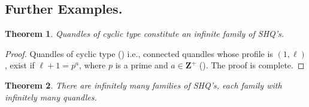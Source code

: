 \documentclass{article}
\newtheorem{theorem}{Theorem}[section]
\newtheorem{example}[theorem]{Example}
\def\drop#1{}
\begin{document}
\subsection{Further Examples.}\label{subsctn:furtherexamples}

\drop{\begin{example}
Cyclic quandles constitute an infinite family of SHQ's with profile as in Theorem \ref{thm:theone}, for $c=2$ and for $\ell$ such that $\ell+1$ is the power of a prime number.
\end{example}
}

\begin{theorem}\label{thm:nestedcyclic}
Quandles of cyclic type constitute an infinite family of SHQ's.
\end{theorem}
\begin{proof}
Quandles of cyclic type (\cite{Lopes_Roseman}) i.e., connected quandles whose profile is $(1, \ell)$, exist if $\ell +1=p^a$, where $p$ is a prime and $a\in \mathbf{Z}^+$ (\cite{Vendramin_1}). The proof is complete.
\end{proof}


\drop{The example above provides us with an infinite family of SHQ's whose profiles are as in Theorem \ref{thm:theone} for $c=2$. Now, for each odd prime number, we present an infinite family of SHQ's whose profiles are as in Theorem \ref{thm:theone} for $c$ as large as we want. We construct such families of SHQ's using Alexander quandles, which lie inside each other like nesting dolls.}



\begin{theorem}\label{thm:infnestedqdles}
There are infinitely many families of SHQ's, each family with infinitely many quandles.
\end{theorem}
\end{document}
